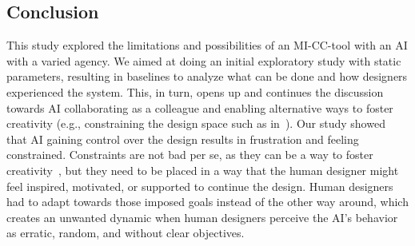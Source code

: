 


\subsection{Conclusion}

This study explored the limitations and possibilities of an MI-CC-tool with an AI with a varied agency. We aimed at doing an initial exploratory study with static parameters, resulting in baselines to analyze what can be done and how designers experienced the system. This, in turn, opens up and continues the discussion towards AI collaborating as a colleague and enabling alternative ways to foster creativity (e.g., constraining the design space such as in~). Our study showed that AI gaining control over the design results in frustration and feeling constrained. Constraints are not bad per se, as they can be a way to foster creativity~, but they need to be placed in a way that the human designer might feel inspired, motivated, or supported to continue the design. Human designers had to adapt towards those imposed goals instead of the other way around, which creates an unwanted dynamic when human designers perceive the AI's behavior as erratic, random, and without clear objectives.




